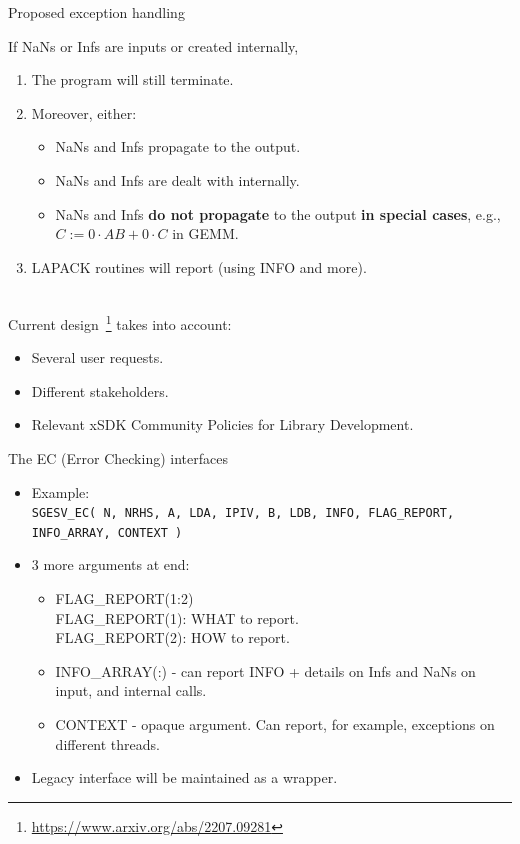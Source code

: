 \documentclass[11pt]{beamer}
\begin{document}
\begin{frame}{Proposed exception handling}

	If NaNs or Infs are inputs or created internally,
	\begin{enumerate}
		\item The program will still terminate.
		\item Moreover, either:
		\begin{itemize}
			\item NaNs and Infs propagate to the output.
			\item NaNs and Infs are dealt with internally.
			\item NaNs and Infs \textbf{do not propagate} to the output \textbf{in special cases}, e.g., $C := 0\cdot AB+0\cdot C$ in GEMM.
		\end{itemize}
		\item LAPACK routines will report (using INFO and more).
	\end{enumerate}

	~\\
	Current design~\footnote{\url{https://www.arxiv.org/abs/2207.09281}} takes into account:
	\begin{itemize}
		\item Several user requests.
		\item Different stakeholders.
		\item Relevant xSDK Community Policies for Library Development.
	\end{itemize}

\end{frame}

\begin{frame}{The EC (Error Checking) interfaces}

	\begin{itemize}
		\setlength\itemsep{1em}
		\item Example:
		~\\
		\texttt{SGESV\_EC( N, NRHS, A, LDA, IPIV, B, LDB, INFO, FLAG\_REPORT, INFO\_ARRAY, CONTEXT )}
		\item 3 more arguments at end:
		\begin{itemize}
			\setlength\itemsep{1em}
			\item FLAG\_REPORT(1:2)\\
			FLAG\_REPORT(1): WHAT to report.\\
			FLAG\_REPORT(2): HOW to report.
			\item INFO\_ARRAY(:) - can report INFO + details on Infs and NaNs on input, and internal calls.
			\item CONTEXT - opaque argument. Can report, for example, exceptions on different threads.
		\end{itemize}
		\item Legacy interface will be maintained as a wrapper.
	\end{itemize}

\end{frame}
\end{document}
